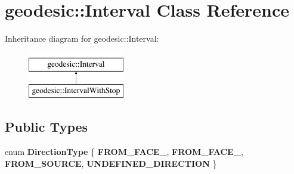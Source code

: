 \hypertarget{classgeodesic_1_1_interval}{}\section{geodesic\+:\+:Interval Class Reference}
\label{classgeodesic_1_1_interval}
Inheritance diagram for geodesic\+:\+:Interval\+:\begin{figure}[H]
\begin{center}
\leavevmode
\includegraphics[height=2.000000cm]{classgeodesic_1_1_interval}
\end{center}
\end{figure}
\subsection*{Public Types}
\begin{DoxyCompactItemize}
\item 
\hypertarget{classgeodesic_1_1_interval_a60fb6352edb68be54a057468b02838d0}{}enum {\bfseries Direction\+Type} \{ {\bfseries F\+R\+O\+M\+\_\+\+F\+A\+C\+E\+\_}, 
{\bfseries F\+R\+O\+M\+\_\+\+F\+A\+C\+E\+\_}, 
{\bfseries F\+R\+O\+M\+\_\+\+S\+O\+U\+R\+C\+E}, 
{\bfseries U\+N\+D\+E\+F\+I\+N\+E\+D\+\_\+\+D\+I\+R\+E\+C\+T\+I\+O\+N}
 \}\label{classgeodesic_1_1_interval_a60fb6352edb68be54a057468b02838d0}

\end{DoxyCompactItemize}

